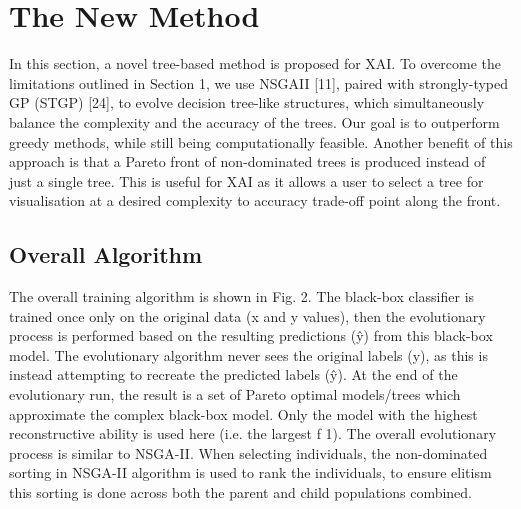 \section{The New Method}
In this section, a novel tree-based method is proposed for XAI. To overcome the limitations outlined in Section 1, we use NSGAII [11], paired with strongly-typed GP (STGP) [24], to evolve decision tree-like structures, which simultaneously balance the complexity and the accuracy of the trees. Our goal is to outperform greedy methods, while still being computationally feasible. Another benefit of this approach is that a Pareto front of non-dominated trees is produced instead of just a single tree. This is useful for XAI as it allows a user to select a tree for visualisation at a desired complexity to accuracy trade-off point along the front.
\subsection{Overall Algorithm}
The overall training algorithm is shown in Fig. 2. The black-box classifier is trained once only on the original data (x and y values), then the evolutionary process is performed based on the resulting predictions (\^{y}) from this black-box model. The evolutionary algorithm never sees the original labels (y), as this is instead attempting to recreate the predicted labels (\^{y}). At the end of the evolutionary run, the result is a set of Pareto optimal models/trees which approximate the complex black-box model. Only the model with the highest reconstructive ability is used here (i.e. the largest f 1). The overall evolutionary process is similar to NSGA-II. When selecting individuals, the non-dominated sorting in NSGA-II algorithm is used to rank the individuals, to ensure elitism this sorting is done across both the parent and child populations combined. 
